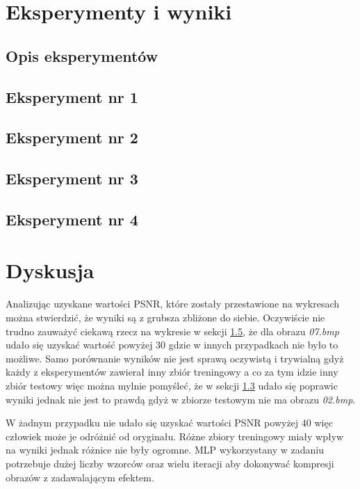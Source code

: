 \documentclass{classrep}
\begin{document}
    \section{Eksperymenty i wyniki} {
        \subsection{Opis eksperymentów} {
            
        }
        \clearpage

        \subsection{Eksperyment nr 1}
        \label{exper_1} {
            
        }
        \clearpage

        \subsection{Eksperyment nr 2}
        \label{exper_2} {
            
        }
        \clearpage

        \subsection{Eksperyment nr 3}
        \label{exper_3} {
            
        }
        \clearpage

        \subsection{Eksperyment nr 4}
        \label{exper_4} {
            
        }
    }

    \section{Dyskusja} {
        Analizując uzyskane wartości PSNR, które zostały przestawione na wykresach można
        stwierdzić, że wyniki są z grubsza zbliżone do siebie. Oczywiście nie trudno
        zauważyć ciekawą rzecz na wykresie w sekcji \ref{exper_4}, że dla obrazu
        \textit{07.bmp} udało się uzyskać wartość powyżej 30 gdzie w innych przypadkach
        nie było to możliwe. Samo porównanie wyników nie jest sprawą oczywistą i
        trywialną gdyż każdy z eksperymentów zawierał inny zbiór treningowy a co za tym
        idzie inny zbiór testowy więc można mylnie pomyśleć, że w sekcji \ref{exper_2}
        udało się poprawic wyniki jednak nie jest to prawdą gdyż w zbiorze testowym nie
        ma obrazu \textit{02.bmp}.

        W żadnym przypadku nie udało się uzyskać wartości PSNR powyżej 40 więc człowiek
        może je odróżnić od oryginału. Różne zbiory treningowy miały wpływ na wyniki
        jednak różnice nie były ogromne. MLP wykorzystany w zadaniu potrzebuje dużej
        liczby wzorców oraz wielu iteracji aby dokonywać kompresji obrazów z
        zadawalającym efektem.
    }

    \begin{thebibliography}{0}
    \end{thebibliography}
\end{document}
